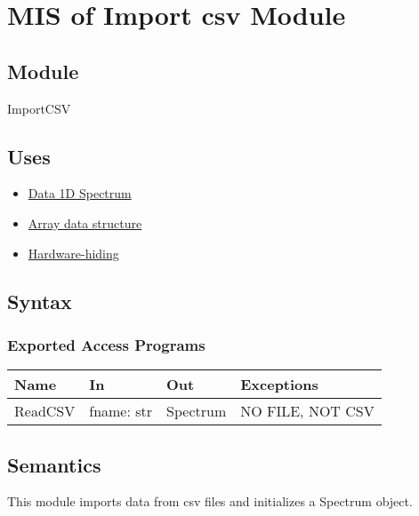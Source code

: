 \documentclass[12pt, titlepage]{article}
\begin{document}

\section{MIS of Import csv Module} \label{Mod:ImportCSV} 
\subsection{Module}
ImportCSV

\subsection{Uses}
\begin{itemize}
    \item \hyperref[Mod:Spectrum]{Data 1D Spectrum}
    \item \hyperref[Mod:Array]{Array data structure}
    \item \hyperref[Mod:HH]{Hardware-hiding}
\end{itemize}

\subsection{Syntax}

\subsubsection{Exported Access Programs}

\begin{center}
    \begin{tabular}{p{2cm} p{4cm} p{4cm} p{5cm}}
        \hline
        \textbf{Name} & \textbf{In} & \textbf{Out} & \textbf{Exceptions} \\
        \hline
        ReadCSV & fname: str & Spectrum & NO FILE, NOT CSV\\
        \hline
    \end{tabular}
\end{center}


\subsection{Semantics}
This module imports data from csv files and initializes a Spectrum object.
\end{document}

